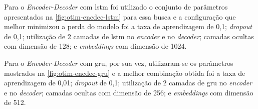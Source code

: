 Para o \textit{Encoder-Decoder} com \acrshort{lstm} foi utilizado o conjunto de parâmetros apresentados na \autoref{fig:otim-encdec-lstm} para essa busca e a configuração que melhor minimizou a perda do modelo foi a taxa de aprendizagem de 0,1; \textit{dropout} de 0,1; utilização de 2 camadas de \acrshort{lstm} no \textit{encoder} e no \textit{decoder}; camadas ocultas com dimensão de 128; e \textit{embeddings} com dimensão de 1024.


Para o \textit{Encoder-Decoder} com \acrshort{gru}, por sua vez, utilizaram-se os parâmetros mostrados na \autoref{fig:otim-encdec-gru} e a melhor combinação obtida foi a taxa de aprendizagem de 0,01; \textit{dropout} de 0,1; utilização de 2 camadas de \acrshort{gru} no \textit{encoder} e no \textit{decoder}; camadas ocultas com dimensão de 256; e \textit{embeddings} com dimensão de 512.

